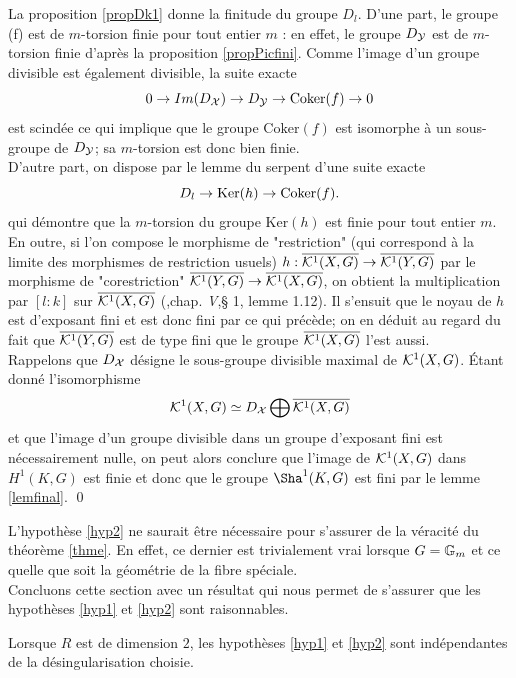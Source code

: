 \documentclass[11pt]{article}
\begin{document}
\proof La proposition \ref{propDk1} donne la finitude du groupe $D_{l}$. D'une part, le groupe (f) est de $m$-torsion finie pour tout entier $m$ : en effet, le groupe $D_{\mathcal{Y}}$ est de $m$-torsion finie d'après la proposition \ref{propPicfini}. Comme l'image d'un groupe divisible est également divisible, la suite exacte
$$
0 \rightarrow Im(D_{\mathcal{X}}) \rightarrow D_{\mathcal{Y}} \rightarrow \text{Coker}(f) \rightarrow 0
$$
est scindée ce qui implique que le groupe $\text{Coker}(f)$ est isomorphe à un sous-groupe de $D_{\mathcal{Y}}$; sa $m$-torsion est donc bien finie.\\
D'autre part, on dispose par le lemme du serpent d'une suite exacte
$$
D_{l} \rightarrow \text{Ker}(h) \rightarrow \text{Coker}(f).
$$
qui démontre que la $m$-torsion du groupe $\text{Ker}(h)$ est finie pour tout entier $m$.\\


En outre, si l'on compose le morphisme de "restriction" (qui correspond à la limite des morphismes de restriction usuels) $h : \overline{\mathcal{K}^1(X, G)} \rightarrow \overline{\mathcal{K}^1(Y, G)}$ par le morphisme de "corestriction" $\overline{\mathcal{K}^1(Y, G)} \rightarrow \overline{\mathcal{K}^1(X, G)}$, on obtient la multiplication par $[l:k]$ sur $\overline{\mathcal{K}^1(X, G)}$ (\cite{Milne},chap. \textit{V},§ 1, lemme 1.12). Il s'ensuit que le noyau de $h$ est d'exposant fini et est donc fini par ce qui précède; on en déduit au regard du fait que $\overline{\mathcal{K}^1(Y, G)}$ est de type fini que le groupe $\overline{\mathcal{K}^1(X,G)}$ l'est aussi.\\
Rappelons que $D_{\mathcal{X}}$ désigne le sous-groupe divisible maximal de $\mathcal{K}^1(X,G)$. Étant donné l'isomorphisme 
$$\mathcal{K}^1(X,G) \simeq D_{\mathcal{X}} \bigoplus \overline{\mathcal{K}^1(X,G)}$$ 
et que l'image d'un groupe divisible dans un groupe d'exposant fini est nécessairement nulle, on peut alors conclure que l'image de $\mathcal{K}^1(X,G)$ dans $H^1(K,G)$ est finie et donc que le groupe $\Sha^1(K,G)$ est fini par le lemme \ref{lemfinal}. \qed


\rmke L'hypothèse \ref{hyp2} ne saurait être nécessaire pour s'assurer de la véracité du théorème \ref{thme}. En effet, ce dernier est trivialement vrai lorsque $G = \mathbb{G}_m$ et ce quelle que soit la géométrie de la fibre spéciale.\\

Concluons cette section avec un résultat qui nous permet de s'assurer que les hypothèses \ref{hyp1} et \ref{hyp2} sont raisonnables.
\begin{prop}
    Lorsque $R$ est de dimension $2$, les hypothèses \ref{hyp1} et \ref{hyp2} sont indépendantes de la désingularisation choisie.
\end{prop}
\end{document}
